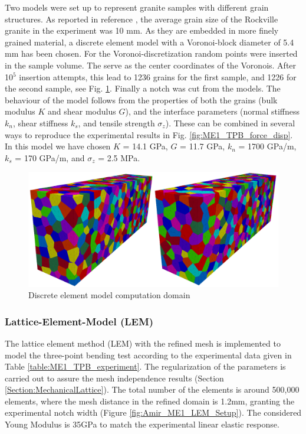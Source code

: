 Two models were set up to represent granite samples with different grain structures. As reported in reference \cite{Tarokh2016161}, the average grain size of the Rockville granite in the experiment was 10 mm. 
As they are embedded in more finely grained material, a discrete element model with a Voronoi-block diameter of 5.4 mm has been chosen. For the Voronoi-discretization random points were inserted in the sample volume. 
The serve as the center coordinates of the Voronois. After 10$^5$ insertion attempts, this lead to 1236 grains for the first sample, and 1226 for the second sample, see Fig. \ref{fig:ME1_TPB_DEM_domain}. Finally a notch was cut from the models. The behaviour of the model follows from the properties of both the grains (bulk modulus $K$ and shear modulus $G$), and the interface parameters (normal stiffness $k_n$, shear stiffness $k_s$, and tensile strength $\sigma_z$). These can be combined in several ways to reproduce the experimental results in Fig. \ref{fig:ME1_TPB_force_disp}. In this model we have chosen $K$ = 14.1 GPa, $G$ = 11.7 GPa, $k_n$ = 1700 GPa/m, $k_s$ = 170 GPa/m, and $\sigma_z$ = 2.5 MPa. 

\begin{figure}[!ht]
\centering
\includegraphics[width=1\textwidth]{figures/ME1-DEM-samples.png}
\caption{Discrete element model computation domain}
\label{fig:ME1_TPB_DEM_domain}
\end{figure}

\subsubsection*{Lattice-Element-Model (LEM)}

The lattice element method (LEM) with the refined mesh is implemented to model the three-point bending test according to the experimental data given in Table \ref{table:ME1_TPB_experiment}. The regularization of the parameters is carried out to assure the mesh independence results (Section \ref{Section:MechanicalLattice}). The total number of the elements is around 500,000 elements, where the mesh distance in the refined domain is 1.2mm, granting the experimental notch width (Figure \ref{fig:Amir_ME1_LEM_Setup}). The considered Young Modulus is 35GPa to match the experimental linear elastic response.

